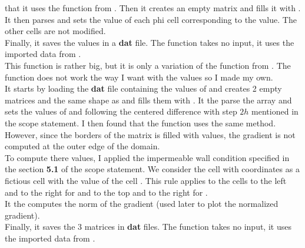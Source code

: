 that it uses the function  from . Then it creates
an empty matrix  and fills it with . It then parses
 and sets the value of each phi cell corresponding to the  value.
The other cells are not modified.\\
Finally, it saves the values in a \textbf{dat} file.
\smallbreak{}
The function  takes no input, it uses the imported data
from .\\
This function is rather big, but it is only a variation of the 
function from . The function  does not work
the way I want with the  values so I made my own.\\
It starts by loading the \textbf{dat} file containing the values of 
and creates 2 empty matrices  and  the same shape as
 and fills them with . It the parse the 
array and sets the values of  and  following the centered
difference with step $2h$ mentioned in the scope statement. I then found that
the function  uses the same method. However, since the
borders of the matrix  is filled with  values, the
gradient is not computed at the outer edge of the domain.\\
To compute there values, I applied the impermeable wall condition specified in
the section \textbf{5.1} of the scope statement. We consider the 
 cell with coordinates \py{[i - 1, j]} as a fictious cell with
the value of the cell \py{[i, j]}. This rule applies to the cells to the left
and to the right for  and to the top and to the right for
.\\
It the computes the norm of the gradient (used later to plot the normalized
gradient).\\
Finally, it saves the 3 matrices in \textbf{dat} files.
\smallbreak{}
The function  takes no input, it uses the imported data
from .\\

